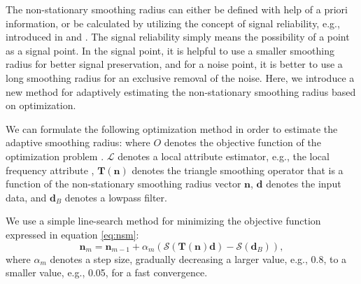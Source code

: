 The non-stationary smoothing radius can either be defined with help of a priori information, or be calculated by utilizing the concept of signal reliability, e.g., introduced in \cite{liuyang2009tvmf} and \cite{sosvmf}. The signal reliability simply means the possibility of a point as a signal point. In the signal point, it is helpful to use a smaller smoothing radius for better signal preservation, and for a noise point, it is better to use a long smoothing radius for an exclusive removal of the noise.  Here, we introduce a new method for adaptively estimating the non-stationary smoothing radius based on optimization. 

We can formulate the following optimization method in order to estimate the adaptive smoothing radius:
where $O$ denotes the objective function of the optimization problem \cite[]{greer2018matching}. $\mathcal{L}$ denotes a local attribute estimator, e.g., the local frequency attribute \cite[]{fomel2007localattr}, $\mathbf{T}(\mathbf{n})$ denotes the triangle smoothing operator that is a function of the non-stationary smoothing radius vector $\mathbf{n}$, $\mathbf{d}$ denotes the input data, and $\mathbf{d}_B$ denotes a lowpass filter. %


We use a simple line-search method for minimizing the objective function expressed in equation \ref{eq:nsm}:
\begin{equation}
\label{eq:nsm2}
\mathbf{n}_{m} = \mathbf{n}_{m-1} + \alpha_m \left( \mathcal{S}\left(\mathbf{T}(\mathbf{n})\mathbf{d}\right) - \mathcal{S}(\mathbf{d}_B) \right),
\end{equation}
where $\alpha_m$ denotes a step size, gradually decreasing a larger value, e.g., 0.8, to a smaller value, e.g., 0.05, for a fast convergence. 

